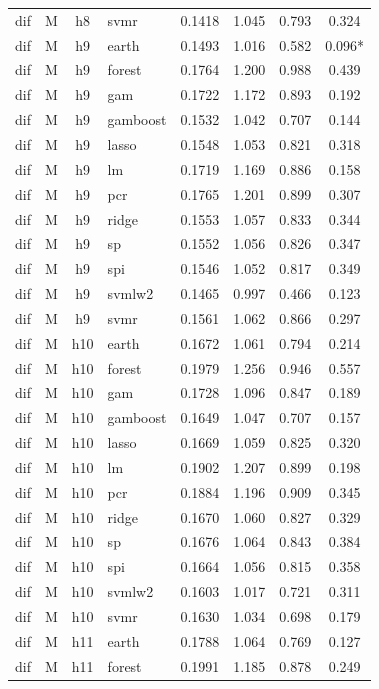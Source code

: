 \begin{ThreePartTable}
\begin{longtable}[t]{llclcccc}
dif & M & h8 & svmr & 0.1418 & 1.045 & 0.793 & 0.324\\
\addlinespace
dif & M & h9 & earth & 0.1493 & 1.016 & 0.582 & 0.096*\\
dif & M & h9 & forest & 0.1764 & 1.200 & 0.988 & 0.439\\
dif & M & h9 & gam & 0.1722 & 1.172 & 0.893 & 0.192\\
dif & M & h9 & gamboost & 0.1532 & 1.042 & 0.707 & 0.144\\
dif & M & h9 & lasso & 0.1548 & 1.053 & 0.821 & 0.318\\
dif & M & h9 & lm & 0.1719 & 1.169 & 0.886 & 0.158\\
dif & M & h9 & pcr & 0.1765 & 1.201 & 0.899 & 0.307\\
dif & M & h9 & ridge & 0.1553 & 1.057 & 0.833 & 0.344\\
dif & M & h9 & sp & 0.1552 & 1.056 & 0.826 & 0.347\\
dif & M & h9 & spi & 0.1546 & 1.052 & 0.817 & 0.349\\
dif & M & h9 & svmlw2 & 0.1465 & 0.997 & 0.466 & 0.123\\
dif & M & h9 & svmr & 0.1561 & 1.062 & 0.866 & 0.297\\
\addlinespace
dif & M & h10 & earth & 0.1672 & 1.061 & 0.794 & 0.214\\
dif & M & h10 & forest & 0.1979 & 1.256 & 0.946 & 0.557\\
dif & M & h10 & gam & 0.1728 & 1.096 & 0.847 & 0.189\\
dif & M & h10 & gamboost & 0.1649 & 1.047 & 0.707 & 0.157\\
dif & M & h10 & lasso & 0.1669 & 1.059 & 0.825 & 0.320\\
dif & M & h10 & lm & 0.1902 & 1.207 & 0.899 & 0.198\\
dif & M & h10 & pcr & 0.1884 & 1.196 & 0.909 & 0.345\\
dif & M & h10 & ridge & 0.1670 & 1.060 & 0.827 & 0.329\\
dif & M & h10 & sp & 0.1676 & 1.064 & 0.843 & 0.384\\
dif & M & h10 & spi & 0.1664 & 1.056 & 0.815 & 0.358\\
dif & M & h10 & svmlw2 & 0.1603 & 1.017 & 0.721 & 0.311\\
dif & M & h10 & svmr & 0.1630 & 1.034 & 0.698 & 0.179\\
\addlinespace
dif & M & h11 & earth & 0.1788 & 1.064 & 0.769 & 0.127\\
dif & M & h11 & forest & 0.1991 & 1.185 & 0.878 & 0.249\\

\end{longtable}
\end{ThreePartTable}

